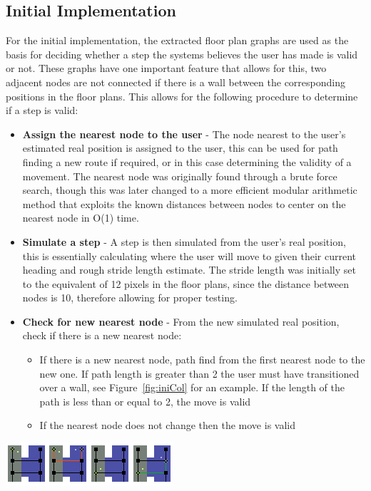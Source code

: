 \documentclass[12pt,a4paper]{report}
\begin{document}
\subsection{Initial Implementation}

For the initial implementation, the extracted floor plan graphs are used as the basis for deciding whether a step the systems believes the user has made is valid or not. These graphs have one important feature that allows for this, two adjacent nodes are not connected if there is a wall between the corresponding positions in the floor plans. This allows for the following procedure to determine if a step is valid:

\begin{itemize}
	\item \textbf{Assign the nearest node to the user} - The node nearest to the user's estimated real position is assigned to the user, this can be used for path finding a new route if required, or in this case determining the validity of a movement. The nearest node was originally found through a brute force search, though this was later changed to a more efficient modular arithmetic method that exploits the known distances between nodes to center on the nearest node in O(1) time.
	\item \textbf{Simulate a step} - A step is then simulated from the user's real position, this is essentially calculating where the user will move to given their current heading and rough stride length estimate. The stride length was initially set to the equivalent of 12 pixels in the floor plans, since the distance between nodes is 10, therefore allowing for proper testing. 
	\item \textbf{Check for new nearest node} - From the new simulated real position, check if there is a new nearest node:
	\begin{itemize}
		\item If there is a new nearest node, path find from the first nearest node to the new one. If path length is greater than 2 the user must have transitioned over a wall, see Figure~\ref{fig:iniCol} for an example. If the length of the path is less than or equal to 2, the move is valid
		\item If the nearest node does not change then the move is valid
	\end{itemize}
\end{itemize}

\begin{center}
\includegraphics[scale=1.5]{images-implementation/collision1.png}
\label{fig:iniCol}
\end{center}
\end{document}
